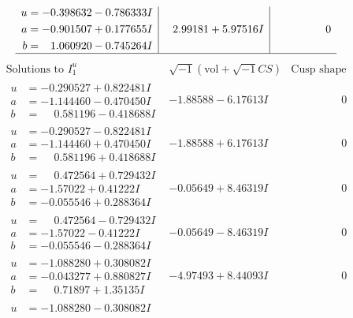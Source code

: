\documentclass[1p]{elsarticle_modified}
\theoremstyle{definition}
\newcommand{\I}{\sqrt{-1}}
\begin{document}
$$\begin{array}{c|c|c}
\begin{aligned}
u &= -0.398632 - 0.786333 I \\
a &= -0.901507 + 0.177655 I \\
b &= \phantom{-}1.060920 - 0.745264 I\end{aligned}
 & \phantom{-}2.99181 + 5.97516 I & \phantom{-0.000000 } 0\\
 \hline 
 \end{array}$$\newpage$$\begin{array}{c|c|c}  
\text{Solutions to }I^u_{1}& \I (\text{vol} + \sqrt{-1}CS) & \text{Cusp shape}\\
 \hline 
\begin{aligned}
u &= -0.290527 + 0.822481 I \\
a &= -1.144460 - 0.470450 I \\
b &= \phantom{-}0.581196 - 0.418688 I\end{aligned}
 & -1.88588 - 6.17613 I & \phantom{-0.000000 } 0 \\ \hline\begin{aligned}
u &= -0.290527 - 0.822481 I \\
a &= -1.144460 + 0.470450 I \\
b &= \phantom{-}0.581196 + 0.418688 I\end{aligned}
 & -1.88588 + 6.17613 I & \phantom{-0.000000 } 0 \\ \hline\begin{aligned}
u &= \phantom{-}0.472564 + 0.729432 I \\
a &= -1.57022 + 0.41222 I \\
b &= -0.055546 + 0.288364 I\end{aligned}
 & -0.05649 + 8.46319 I & \phantom{-0.000000 } 0 \\ \hline\begin{aligned}
u &= \phantom{-}0.472564 - 0.729432 I \\
a &= -1.57022 - 0.41222 I \\
b &= -0.055546 - 0.288364 I\end{aligned}
 & -0.05649 - 8.46319 I & \phantom{-0.000000 } 0 \\ \hline\begin{aligned}
u &= -1.088280 + 0.308082 I \\
a &= -0.043277 + 0.880827 I \\
b &= \phantom{-}0.71897 + 1.35135 I\end{aligned}
 & -4.97493 + 8.44093 I & \phantom{-0.000000 } 0 \\ \hline\begin{aligned}
u &= -1.088280 - 0.308082 I \\

\end{aligned}
\end{array}$$
\end{document}
